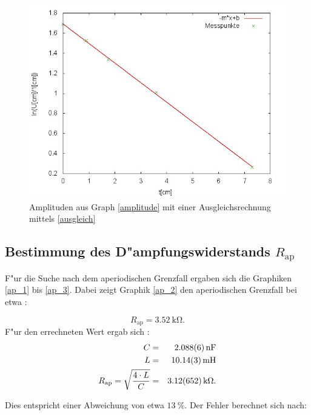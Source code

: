 	\begin{figure}[H]
		\centering
		\includegraphics[width = 12cm]{img/graph_a_2.jpg}
		\caption{Amplituden aus Graph \eqref{amplitude} mit einer Ausgleichsrechnung mittels \eqref{ausgleich}}
		\label{amplitude_fit}
	\end{figure}

	

	\subsection{Bestimmung des D"ampfungswiderstands $R_\mathrm{ap}$} %
	\label{sub:bestimmung_des_d_ampfungswiderstands_r_}
	

	F"ur die Suche nach dem aperiodischen Grenzfall ergaben sich die Graphiken \eqref{ap_1} bis \eqref{ap_3}.
	Dabei zeigt Graphik \eqref{ap_2} den aperiodischen Grenzfall bei etwa :

	\begin{equation*}
		R_\mathrm{ap} = \SI{3.52}{\kilo\ohm}.
	\end{equation*}
		F"ur den errechneten Wert ergab sich :
	\begin{eqnarray*}
		C &=& \SI{2.088 (6)}{\nano \farad}\\
		L &=& \SI{10.14 (3)}{\milli \henry}\\
		R_\mathrm{ap} = \sqrt{\frac{4 \cdot L}{C}} &=& \SI{3.12 (652)}{\kilo\ohm}.
	\end{eqnarray*}

	Dies entspricht einer Abweichung von etwa $\SI{13}{\%}$.
	Der Fehler berechnet sich nach:

